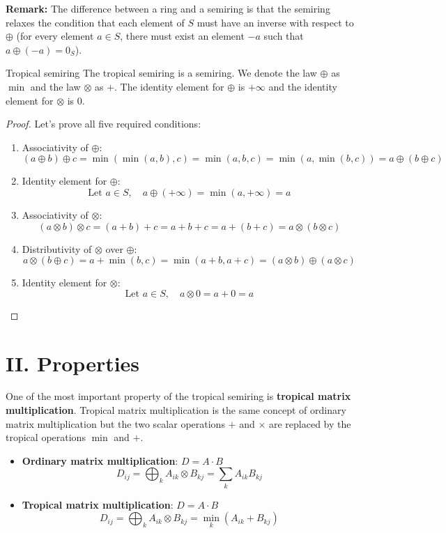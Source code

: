 \documentclass{article}
\begin{document}
\textbf{Remark:} The difference between a ring and a semiring is that the semiring relaxes the condition that each element of $S$ must have an inverse with respect to $\oplus$ (for every element $a \in S$, there must exist an element $-a$ such that $a \oplus (-a) = 0_S$).

\begin{mytheorem}{Tropical semiring}
The tropical semiring is a semiring. We denote the law $\oplus$ as $\min$ and the law $\otimes$ as $+$. The identity element for $\oplus$ is $+\infty$ and the identity element for $\otimes$ is $0$.
\end{mytheorem}

\begin{proof}
Let's prove all five required conditions:
\begin{enumerate}
    \item Associativity of $\oplus$:
    \[
    (a \oplus b) \oplus c = \min(\min(a,b), c) = \min(a,b,c) = \min(a, \min(b,c)) = a \oplus (b \oplus c)
    \]
    \item Identity element for $\oplus$:
    \[
    \text{Let } a \in S, \quad a \oplus (+\infty) = \min(a, +\infty) = a
    \]
    \item Associativity of $\otimes$:
    \[
    (a \otimes b) \otimes c = (a + b) + c = a + b + c = a + (b + c) = a \otimes (b \otimes c)
    \]
    \item Distributivity of $\otimes$ over $\oplus$:
    \[
    a \otimes (b \oplus c) = a + \min(b,c) = \min(a+b, a+c) = (a \otimes b) \oplus (a \otimes c)
    \]
    \item Identity element for $\otimes$:
    \[
    \text{Let } a \in S, \quad a \otimes 0 = a + 0 = a
    \]
\end{enumerate}
\end{proof}

\section*{II. Properties}

One of the most important property of the tropical semiring is \textbf{tropical matrix multiplication}. Tropical matrix multiplication is the same concept of ordinary matrix multiplication but the two scalar operations $+$ and $\times$ are replaced by the tropical operations $\min$ and $+$.

\begin{itemize}
    \item \textbf{Ordinary matrix multiplication}: $D = A \cdot B$
    \[
    D_{ij} = \bigoplus_k A_{ik} \otimes B_{kj} = \sum_k A_{ik} B_{kj}
    \]
    \item \textbf{Tropical matrix multiplication}: $D = A \cdot B$
    \[
    D_{ij} = \bigoplus_k A_{ik} \otimes B_{kj} = \min_k (A_{ik} + B_{kj})
    \]
\end{itemize}
\end{document}
